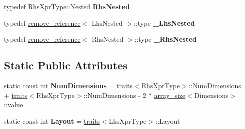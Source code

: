 \begin{DoxyCompactItemize}
typedef Rhs\+Xpr\+Type\+::\+Nested {\bfseries Rhs\+Nested}
\item 
\mbox{\label{struct_eigen_1_1internal_1_1traits_3_01_tensor_contraction_op_3_01_dimensions_00_01_lhs_xpr_type_00_01_rhs_xpr_type_01_4_01_4_aae5c6a8716b3677fd0e37498a150db12}} 
typedef \hyperlink{struct_eigen_1_1internal_1_1remove__reference}{remove\+\_\+reference}$<$ Lhs\+Nested $>$\+::type {\bfseries \+\_\+\+Lhs\+Nested}
\item 
\mbox{\label{struct_eigen_1_1internal_1_1traits_3_01_tensor_contraction_op_3_01_dimensions_00_01_lhs_xpr_type_00_01_rhs_xpr_type_01_4_01_4_ad64e5b1916dc1ba1d93b7b058d0c575f}} 
typedef \hyperlink{struct_eigen_1_1internal_1_1remove__reference}{remove\+\_\+reference}$<$ Rhs\+Nested $>$\+::type {\bfseries \+\_\+\+Rhs\+Nested}
\end{DoxyCompactItemize}
\subsection*{Static Public Attributes}
\begin{DoxyCompactItemize}
\item 
\mbox{\label{struct_eigen_1_1internal_1_1traits_3_01_tensor_contraction_op_3_01_dimensions_00_01_lhs_xpr_type_00_01_rhs_xpr_type_01_4_01_4_aba3ca5355756b0814d12cd057d36b16a}} 
static const int {\bfseries Num\+Dimensions} = \hyperlink{struct_eigen_1_1internal_1_1traits}{traits}$<$Rhs\+Xpr\+Type$>$\+::Num\+Dimensions + \hyperlink{struct_eigen_1_1internal_1_1traits}{traits}$<$Rhs\+Xpr\+Type$>$\+::Num\+Dimensions -\/ 2 $\ast$ \hyperlink{struct_eigen_1_1internal_1_1array__size}{array\+\_\+size}$<$Dimensions$>$\+::value
\item 
\mbox{\label{struct_eigen_1_1internal_1_1traits_3_01_tensor_contraction_op_3_01_dimensions_00_01_lhs_xpr_type_00_01_rhs_xpr_type_01_4_01_4_a22412c2e933b312055c114e0ff024217}} 
static const int {\bfseries Layout} = \hyperlink{struct_eigen_1_1internal_1_1traits}{traits}$<$Lhs\+Xpr\+Type$>$\+::Layout
\end{DoxyCompactItemize}


